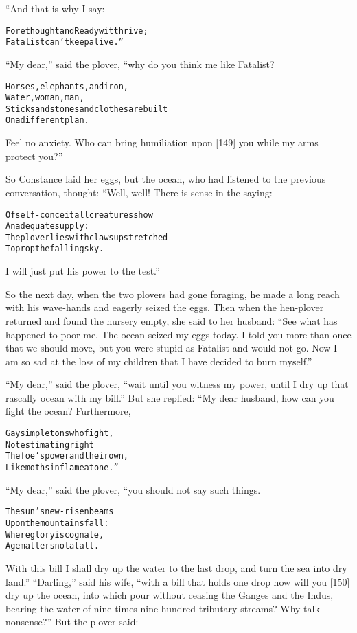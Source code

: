\documentclass{article}
\renewenvironment{verbatim}{\begin{alltt}\normalfont\begin{centering}}{\end{centering}\end{alltt}}
\begin{document}
“And that is why I say:

\begin{verbatim}
Forethought and Readywit thrive;
Fatalist can't keep alive.”
\end{verbatim}
``My dear,'' said the plover, “why do you think me like Fatalist?

\begin{verbatim}
Horses, elephants, and iron,
Water, woman, man,
Sticks and stones and clothes are built
On a different plan.
\end{verbatim}
Feel no anxiety. Who can bring humiliation upon [149] you while my
arms protect you?”

So Constance laid her eggs, but the ocean, who had listened to the
previous conversation, thought: “Well, well! There is sense in the
saying:

\begin{verbatim}
Of self-conceit all creatures show
    An adequate supply:
The plover lies with claws upstretched
    To prop the falling sky.
\end{verbatim}
I will just put his power to the test.”

So the next day, when the two plovers had gone foraging, he made a
long reach with his wave-hands and eagerly seized the eggs. Then
when the hen-plover returned and found the nursery empty, she said
to her husband:
``See what has happened to poor me. The ocean seized my eggs today. I told you more than once that we should move, but you were stupid as Fatalist and would not go. Now I am so sad at the loss of my children that I have decided to burn myself.''

``My dear,'' said the plover,
``wait until you witness my power, until I dry up that rascally ocean with my bill.''
But she replied: “My dear husband, how can you fight the ocean?
Furthermore,

\begin{verbatim}
Gay simpletons who fight,
Not estimating right
The foe's power and their own,
Like moths in flame atone.”
\end{verbatim}
``My dear,'' said the plover, “you should not say such things.

\begin{verbatim}
The sun's new-risen beams
Upon the mountains fall:
Where glory is cognate,
Age matters not at all.
\end{verbatim}
With this bill I shall dry up the water to the last drop, and turn
the sea into dry land.” ``Darling,'' said his wife,
``with a bill that holds one drop how will you [150] dry up the ocean, into which pour without ceasing the Ganges and the Indus, bearing the water of nine times nine hundred tributary streams? Why talk nonsense?''
But the plover said:
\end{document}
